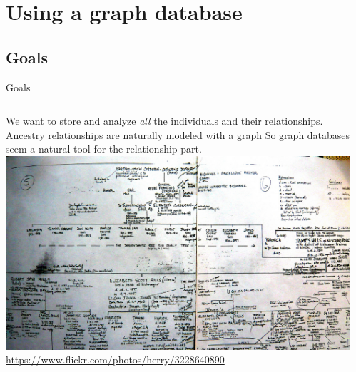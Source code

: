 \documentclass{beamer}
\newcommand{\linespace}{\vskip 0.25cm}
\begin{document}
\section[Using a graph DB]{Using a graph database}

\subsection{Goals}

\begin{frame}{Goals}
	\begin{columns}
		\begin{column}{0.6 \linewidth}
					We want to store and analyze \emph{all} the individuals and their relationships.
					\linespace
					Ancestry relationships are naturally modeled with a graph
					\linespace
					So graph databases seem a natural tool for the relationship part.
					\linespace
					\centering
					\includegraphics[width=0.8 \linewidth]{Figures/FamilyTree.jpg} \\
					\tiny{\url{https://www.flickr.com/photos/herry/3228640890}}
		\end{column}
		\begin{column}{0.4 \linewidth}

\end{column}
\end{columns}
\end{frame}
\end{document}
